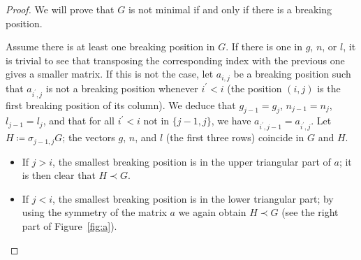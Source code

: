 \documentclass{amsart}
\theoremstyle{plain}
\theoremstyle{definition}
\begin{document}
\begin{proof}
  We will prove that $G$ is not minimal if and only if there is a
  breaking position.

  Assume there is at least one breaking position in $G$. If there is
  one in $g$, $n$, or $l$, it is trivial to see that transposing the
  corresponding index with the previous one gives a smaller matrix. If
  this is not the case, let $a_{i,j}$ be a breaking position such that
  $a_{i^\prime,j}$ is not a breaking position whenever $i^\prime < i$
  (the position $(i,j)$ is the first breaking position of its
  column). We deduce that $g_{j-1} = g_j$, $n_{j-1} = n_j$, $l_{j-1} =
  l_j$, and that for all $i^\prime < i$ not in $\{j-1,j\}$, we have
  $a_{i^\prime, j-1} = a_{i^\prime, j}$. Let $H \coloneqq
  \sigma_{j-1,j} G$; the vectors $g$, $n$, and $l$ (the first three
  rows) coincide in $G$ and $H$.
  \begin{itemize}
  \item If $j > i$, the smallest breaking position is in the upper
    triangular part of $a$; it is then clear that $H \prec G$.
  \item If $j < i$, the smallest breaking position is in the lower
    triangular part; by using the symmetry of the matrix $a$ we again
    obtain $H \prec G$ (see the right part of Figure~\ref{fig:a}).
  \end{itemize}

  \begin{figure}[t]
\end{figure}
\end{proof}
\end{document}
